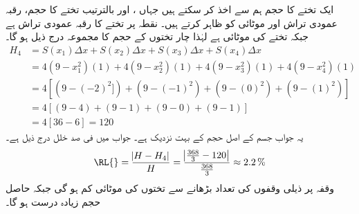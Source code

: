 ایک تختے کا حجم  ہم  سے اخذ کر سکتے ہیں جہاں ،  اور  بالترتیب تختے کا حجم، رقبہ عمودی تراش اور موٹائی کو ظاہر کرتے ہیں۔ نقطہ  پر تختے کا رقبہ عمودی تراش  ہے جبکہ تختے کی موٹائی  ہے لہٰذا چار تختوں کے حجم کا مجموعہ درج ذیل ہو گا۔
\begin{align*}
H_4&=S(x_1)\Delta x+S(x_2)\Delta x+S(x_3)\Delta x+S(x_4)\Delta x\\
&=4(9-x_1^2)(1)+4(9-x_2^2)(1)+4(9-x_3^2)(1)+4(9-x_4^2)(1)\\
&=4[(9-(-2)^2])+(9-(-1)^2)+(9-(0)^2)+(9-(1)^2)]\\
&=4[(9-4)+(9-1)+(9-0)+(9-1)]\\
&=4[36-6]=120
\end{align*} 
یہ جواب  جسم کے اصل حجم  کے بہت نزدیک ہے۔ جواب میں فی صد خلل درج ذیل ہے۔
\begin{align*}
\text{\RL{}}=\frac{\abs{H-H_4}}{H}=\frac{\abs{\tfrac{368}{3}-120}}{\tfrac{368}{3}}\approx \SI{2.2}{\percent}
\end{align*}
وقفہ  پر ذیلی وقفوں  کی تعداد بڑھانے سے تختوں کی موٹائی کم ہو گی جبکہ حاصل حجم زیادہ درست ہو گا۔
\begin{figure}
\centering
\begin{minipage}{0.45\textwidth}
\centering
{}
\end{minipage}\hfill
\begin{minipage}{0.45\textwidth}
\centering
{}
\end{minipage}
\end{figure}


